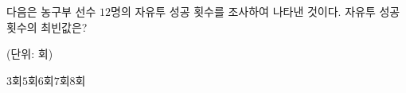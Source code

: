 다음은 농구부 선수 $12$명의 자유투 성공 횟수를 조사하여 나타낸 것이다. 자유투 성공 횟수의 최빈값은?\par\noindent\hfill{\footnotesize (단위: 회)}
\begin{choices32}{$3$회}{$5$회}{$6$회}{$7$회}{$8$회}\end{choices32}
